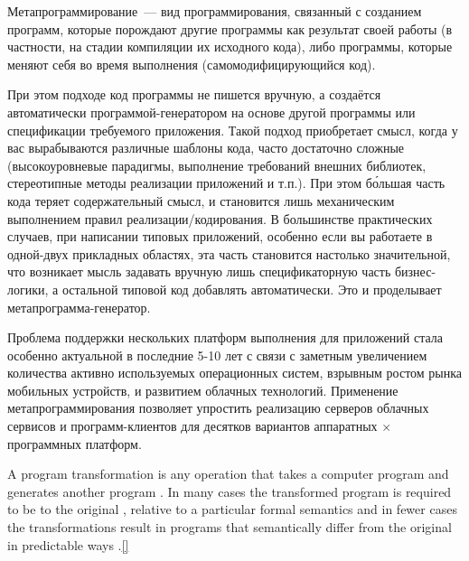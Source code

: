 \secdown{}\secdown

Метапрограммирование\ --- вид программирования, связанный с созданием программ,
которые порождают другие программы как результат своей работы (в частности, на
стадии компиляции их исходного кода), либо программы, которые меняют себя во
время выполнения (самомодифицирующийся код).


При этом подходе код программы не пишется вручную, а создаётся автоматически
программой-генератором на основе другой программы или спецификации требуемого
приложения. Такой подход приобретает смысл, когда у вас вырабываются различные
шаблоны кода, часто достаточно сложные (высокоуровневые парадигмы, выполнение
требований внешних библиотек, стереотипные методы реализации приложений и т.п.).
При этом б\'{о}льшая часть кода теряет содержательный смысл, и становится лишь
механическим выполнением правил реализации/кодирования. В большинстве
практических случаев, при написании типовых приложений, особенно если вы
работаете в одной-двух прикладных областях, эта часть становится настолько
значительной, что возникает мысль задавать вручную лишь спецификаторную часть
бизнес-логики, а остальной типовой код добавлять автоматически. Это и
проделывает метапрограмма-генератор.


Проблема поддержки нескольких платформ выполнения для приложений стала особенно
актуальной в последние 5-10 лет с связи с заметным увеличением количества
активно используемых операционных систем, взрывным ростом рынка мобильных
устройств, и развитием облачных технологий. Применение метапрограммирования
позволяет упростить реализацию серверов облачных сервисов и программ-клиентов
для десятков вариантов аппаратных $\times$ программных платформ.


A program transformation  is any operation  that takes a computer program  and generates another program .
In many cases  the transformed program is required to be
 to the original , relative to a
particular formal semantics  and in fewer cases  the transformations
result in programs that semantically differ from the original in predictable
ways .\ref{}

